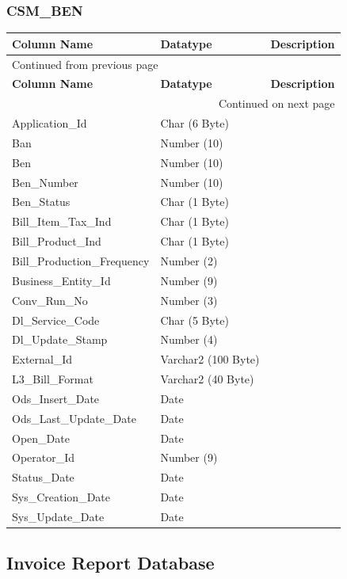 \documentclass[12pt,twoside]{article}
\begin{document}
\normalsize
\newpage
\subsubsection{CSM\_BEN}
\label{sec:orgheadline153}
\footnotesize

\begin{longtable}{l|l|l}
\hline
\textbf{Column Name} & \textbf{Datatype} & \textbf{Description}\\
\hline
\endfirsthead
\multicolumn{3}{l}{Continued from previous page} \\
\hline

\textbf{Column Name} & \textbf{Datatype} & \textbf{Description} \\

\hline
\endhead
\hline\multicolumn{3}{r}{Continued on next page} \\
\endfoot
\endlastfoot
\hline
Application\_Id & Char (6 Byte) & \\
Ban & Number (10) & \\
Ben & Number (10) & \\
Ben\_Number & Number (10) & \\
Ben\_Status & Char (1 Byte) & \\
Bill\_Item\_Tax\_Ind & Char (1 Byte) & \\
Bill\_Product\_Ind & Char (1 Byte) & \\
Bill\_Production\_Frequency & Number (2) & \\
Business\_Entity\_Id & Number (9) & \\
Conv\_Run\_No & Number (3) & \\
Dl\_Service\_Code & Char (5 Byte) & \\
Dl\_Update\_Stamp & Number (4) & \\
External\_Id & Varchar2 (100 Byte) & \\
L3\_Bill\_Format & Varchar2 (40 Byte) & \\
Ods\_Insert\_Date & Date & \\
Ods\_Last\_Update\_Date & Date & \\
Open\_Date & Date & \\
Operator\_Id & Number (9) & \\
Status\_Date & Date & \\
Sys\_Creation\_Date & Date & \\
Sys\_Update\_Date & Date & \\
\hline
\end{longtable}
\normalsize
\subsection{Invoice Report Database}
\label{sec:orgheadline158}
\end{document}
